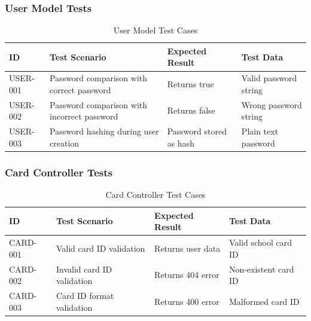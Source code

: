 \subsubsection{User Model Tests}
\begin{table}[H]
\centering
\small
\renewcommand{\arraystretch}{1.3}
\begin{tabularx}{\textwidth}{|l|>{\RaggedRight\arraybackslash}X|>{\RaggedRight\arraybackslash}X|>{\RaggedRight\arraybackslash}p{3.5cm}|}
\hline
\textbf{ID} & \textbf{Test Scenario} & \textbf{Expected Result} & \textbf{Test Data} \\
\hline
USER-001 & Password comparison with correct password & Returns true & Valid password string \\
\hline
USER-002 & Password comparison with incorrect password & Returns false & Wrong password string \\
\hline
USER-003 & Password hashing during user creation & Password stored as hash & Plain text password \\
\hline
\end{tabularx}
\caption{User Model Test Cases}
\label{tab:user-model-tests}
\end{table}

\subsubsection{Card Controller Tests}
\begin{table}[H]
\centering
\small
\renewcommand{\arraystretch}{1.3}
\begin{tabularx}{\textwidth}{|l|>{\RaggedRight\arraybackslash}X|>{\RaggedRight\arraybackslash}X|>{\RaggedRight\arraybackslash}p{3.5cm}|}
\hline
\textbf{ID} & \textbf{Test Scenario} & \textbf{Expected Result} & \textbf{Test Data} \\
\hline
CARD-001 & Valid card ID validation & Returns user data & Valid school card ID \\
\hline
CARD-002 & Invalid card ID validation & Returns 404 error & Non-existent card ID \\
\hline
CARD-003 & Card ID format validation & Returns 400 error & Malformed card ID \\
\hline
\end{tabularx}
\caption{Card Controller Test Cases}
\label{tab:card-controller-tests}
\end{table}

